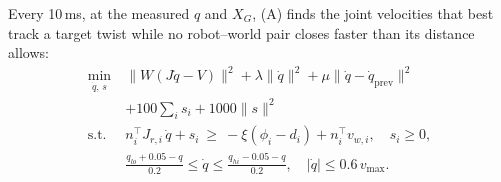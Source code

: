 \documentclass[conference]{IEEEtran}
\begin{document}
Every 10\,ms, at the measured $q$ and $X_G$, (A) finds the joint velocities that best track a target twist while no
robot--world pair closes faster than its distance allows:
\begin{equation}
\begin{aligned}
\min_{\dot q,\,s}\ & \lVert W(J\dot q-V)\rVert^2+\lambda\lVert\dot q\rVert^2+\mu\lVert\dot q-\dot q_{\text{prev}}\rVert^2\\
& +100\textstyle\sum_i s_i+1000\lVert s\rVert^2\\
\text{s.t.}\ & n_i^\top J_{r,i}\,\dot q+s_i\ \ge\ -\xi(\phi_i-d_i)+n_i^\top v_{w,i},\quad s_i\ge0,\\
& \tfrac{q_{lo}+0.05-q}{0.2}\le\dot q\le\tfrac{q_{hi}-0.05-q}{0.2},\quad|\dot q|\le0.6\,v_{\max}.
\end{aligned}
\label{eq:qpfull}
\end{equation}
\end{document}

